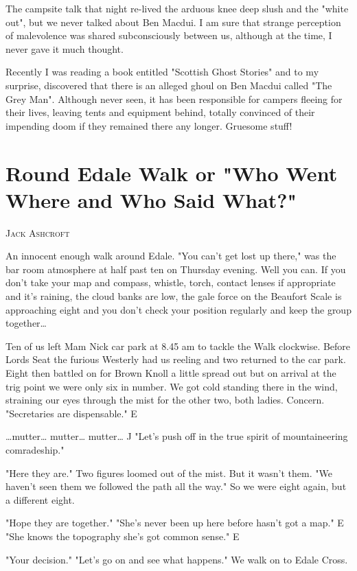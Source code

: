 \documentclass[a5paper,openany,font 10pt]{scrbook}
\makeatletter
\newcommand{\chapterauthor}[1]{%
{\parindent0pt\vspace*{-5pt}%
\linespread{1.1}\large\scshape#1%
\par\nobreak\vspace*{35pt}}
\@afterheading%
}
\makeatother
\begin{document}
The campsite talk that night re-lived the arduous knee deep
slush and the "white out", but we never talked about Ben Macdui.
I am sure that strange perception of malevolence was shared
subconsciously between us, although at the time, I never gave it
much thought.

Recently I was reading a book entitled "Scottish Ghost
Stories" and to my surprise, discovered that there is an alleged
ghoul on Ben Macdui called "The Grey Man". Although never seen,
it has been responsible for campers fleeing for their lives,
leaving tents and equipment behind, totally convinced of their
impending doom if they remained there any longer.
Gruesome stuff!

\chapter{Round Edale Walk or "Who Went Where and Who Said What?"}
\label{sec:orgfa07be5}
\chapterauthor{Jack Ashcroft}

An innocent enough walk around Edale.
"You can't get lost up there," was the bar room atmosphere
at half past ten on Thursday evening.
Well you can. If you don't take your map and compass,
whistle, torch, contact lenses   if appropriate  and it's
raining, the cloud banks are low, the gale force on the Beaufort
Scale is approaching eight and you don't check your position
regularly and keep the group together\ldots{}

Ten of us left Mam Nick car park at 8.45 am to tackle the
Walk clockwise. Before Lords Seat the furious Westerly had us
reeling and two returned to the car park. Eight then battled on
for Brown Knoll   a little spread out   but on arrival at the
trig point we were only six in number. We got cold standing there
in the wind, straining our eyes through the mist for the other
two, both ladies. Concern.
    "Secretaries are dispensable."  E

\ldots{}mutter\ldots{}  mutter\ldots{}  mutter\ldots{}  J
  "Let's push off in the true spirit of mountaineering
comradeship."

"Here they are."
Two figures loomed out of the mist. But it wasn't them.
"We haven't seen them    we followed the path all the way."
So we were eight again, but a different eight.

"Hope they are together."
  "She's never been up here before   hasn't got a map."  E
  "She knows the topography   she's got common sense."  E

"Your decision."
  "Let's go on and see what happens."
We walk on to Edale Cross.
\end{document}
